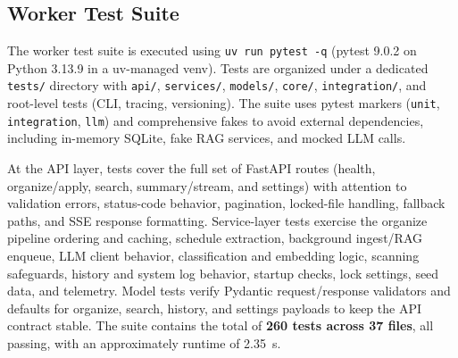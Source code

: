 \documentclass[12pt,oneside,openright,a4paper]{cpe-english-project}
\begin{document}
\subsection{Worker Test Suite}
The worker test suite is executed using \texttt{uv run pytest -q} (pytest 9.0.2 on Python 3.13.9 in a uv-managed venv). Tests are organized under a dedicated \texttt{tests/} directory with \texttt{api/}, \texttt{services/}, \texttt{models/}, \texttt{core/}, \texttt{integration/}, and root-level tests (CLI, tracing, versioning). The suite uses pytest markers (\texttt{unit}, \texttt{integration}, \texttt{llm}) and comprehensive fakes to avoid external dependencies, including in-memory SQLite, fake RAG services, and mocked LLM calls.

At the API layer, tests cover the full set of FastAPI routes (health, organize/apply, search, summary/stream, and settings) with attention to validation errors, status-code behavior, pagination, locked-file handling, fallback paths, and SSE response formatting. Service-layer tests exercise the organize pipeline ordering and caching, schedule extraction, background ingest/RAG enqueue, LLM client behavior, classification and embedding logic, scanning safeguards, history and system log behavior, startup checks, lock settings, seed data, and telemetry. Model tests verify Pydantic request/response validators and defaults for organize, search, history, and settings payloads to keep the API contract stable. The suite contains the total of \textbf{260 tests across 37 files}, all passing, with an approximately runtime of  2.35~s.
\end{document}
